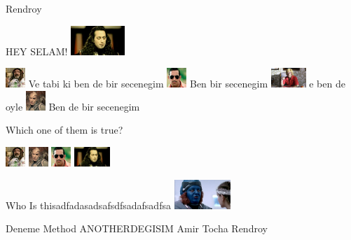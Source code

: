 \documentclass{exam}
\begin{document}
\begin{questions}
\begin{oneparchoices}
Rendroy
\end{oneparchoices}
\question HEY SELAM!\newline
\includegraphics[height=3em]{komutanlogar.jpeg} \newline
\begin{oneparchoices}
\choice \includegraphics[height=2em]{faruk.jpg}
Ve tabi ki ben de bir secenegim
\choice \includegraphics[height=2em]{arifisik.jpg}
Ben bir secenegim
\choice \includegraphics[height=2em]{ersan.jpg}
e ben de oyle
\CorrectChoice \includegraphics[height=2em]{216.jpg}
Ben de bir secenegim
\end{oneparchoices}
\question Which one of them is true?\newline
\begin{oneparchoices}
\choice \includegraphics[height=2em]{faruk.jpg}
\choice \includegraphics[height=2em]{216.jpg}
\CorrectChoice \includegraphics[height=2em]{arifisik.jpg}
\choice \includegraphics[height=2em]{komutanlogar.jpeg}
\end{oneparchoices}
\question Who Is thisadfadasadsafsdfsadafsadfsa\newline
\includegraphics[height=3em]{rendroy2.jpg} \newline
\begin{oneparchoices}
\choice Deneme Method
\CorrectChoice ANOTHERDEGISIM
\choice Amir Tocha
\CorrectChoice Rendroy
\end{oneparchoices}
\end{questions}
\end{document}
